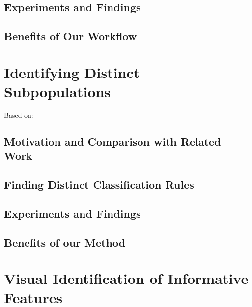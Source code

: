 \documentclass[
]{book}
\begin{document}
\hypertarget{experiments-and-findings}{%
\section{Experiments and Findings}\label{experiments-and-findings}}

\hypertarget{benefits-of-our-workflow}{%
\section{Benefits of Our Workflow}\label{benefits-of-our-workflow}}

\hypertarget{sdclu}{%
\chapter{Identifying Distinct Subpopulations}\label{sdclu}}

Based on: \autocite{Niemann:CBMS2017}

\hypertarget{motivation-and-comparison-with-related-work-1}{%
\section{Motivation and Comparison with Related Work}\label{motivation-and-comparison-with-related-work-1}}

\hypertarget{finding-distinct-classification-rules}{%
\section{Finding Distinct Classification Rules}\label{finding-distinct-classification-rules}}

\hypertarget{experiments-and-findings-1}{%
\section{Experiments and Findings}\label{experiments-and-findings-1}}

\hypertarget{benefits-of-our-method}{%
\section{Benefits of our Method}\label{benefits-of-our-method}}

\hypertarget{visual-identification-of-informative-features}{%
\chapter{Visual Identification of Informative Features}\label{visual-identification-of-informative-features}}
\end{document}
